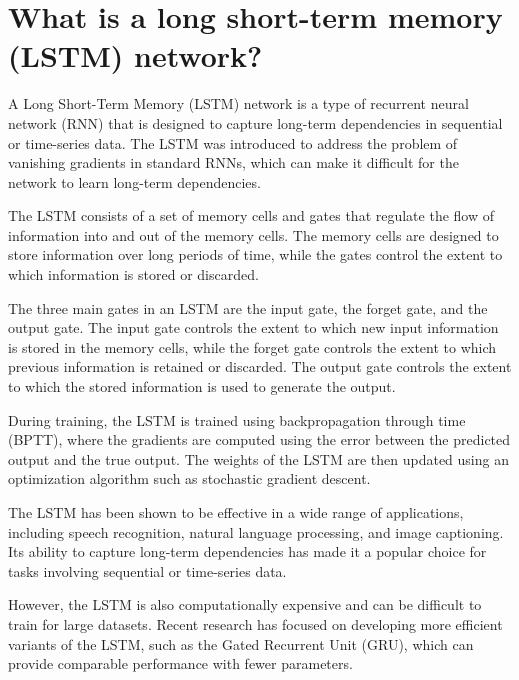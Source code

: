 \section{What is a long short-term memory (LSTM) network?}
A Long Short-Term Memory (LSTM) network is a type of recurrent neural network (RNN) that is designed to capture long-term dependencies in sequential or time-series data. The LSTM was introduced to address the problem of vanishing gradients in standard RNNs, which can make it difficult for the network to learn long-term dependencies.

The LSTM consists of a set of memory cells and gates that regulate the flow of information into and out of the memory cells. The memory cells are designed to store information over long periods of time, while the gates control the extent to which information is stored or discarded.

The three main gates in an LSTM are the input gate, the forget gate, and the output gate. The input gate controls the extent to which new input information is stored in the memory cells, while the forget gate controls the extent to which previous information is retained or discarded. The output gate controls the extent to which the stored information is used to generate the output.

During training, the LSTM is trained using backpropagation through time (BPTT), where the gradients are computed using the error between the predicted output and the true output. The weights of the LSTM are then updated using an optimization algorithm such as stochastic gradient descent.

The LSTM has been shown to be effective in a wide range of applications, including speech recognition, natural language processing, and image captioning. Its ability to capture long-term dependencies has made it a popular choice for tasks involving sequential or time-series data.

However, the LSTM is also computationally expensive and can be difficult to train for large datasets. Recent research has focused on developing more efficient variants of the LSTM, such as the Gated Recurrent Unit (GRU), which can provide comparable performance with fewer parameters.

